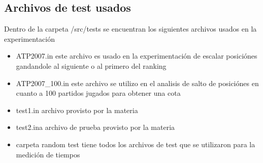 \subsection{Archivos de test usados}
Dentro de la carpeta /src/tests se encuentran los siguientes archivos usados en la experimentaci\'on
\begin{itemize}
 \item ATP2007.in este archivo es usado en la experimentaci\'on de escalar posici\'ones gandandole al siguiente o al primero del ranking
 \item ATP2007\_100.in este archivo se utilizo en el analisis de salto de posici\'ones en cuanto a 100 partidos jugados para obtener una cota
 \item test1.in archivo provisto por la materia
 \item test2.ina archivo de prueba provisto por la materia
 \item carpeta random test tiene todos los archivos de test que se utilizaron para la medici\'on de tiempos
\end{itemize}

